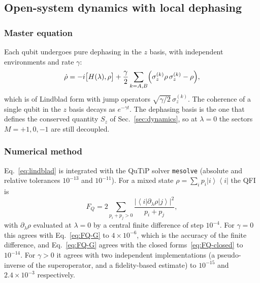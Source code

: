 \documentclass[11pt,a4paper]{article}
\newcommand{\ket}[1]{\left|#1\right\rangle}
\newcommand{\bra}[1]{\left\langle #1\right|}
\newcommand{\FQ}{F_Q}
\begin{document}
\subsection{Open-system dynamics with local dephasing}

\subsubsection{Master equation}
Each qubit undergoes pure dephasing in the $z$ basis, with independent environments and rate $\gamma$:
\begin{equation}
  \dot\rho=-i\bigl[H(\lambda),\rho\bigr]+\frac\gamma2\sum_{k=A,B}\Bigl(\sigma_z^{(k)}\rho\,\sigma_z^{(k)}-\rho\Bigr),
  \label{eq:lindblad}
\end{equation}
which is of Lindblad form \cite{Lindblad1976,GKS1976,BreuerPetruccione2002} with jump operators $\sqrt{\gamma/2}\,\sigma_z^{(k)}$. The coherence of a single qubit in the $z$ basis decays as $e^{-\gamma t}$. The dephasing basis is the one that defines the conserved quantity $S_z$ of Sec.~\ref{sec:dynamics}, so at $\lambda=0$ the sectors $M=+1,0,-1$ are still decoupled.

\subsubsection{Numerical method}
Eq.~\eqref{eq:lindblad} is integrated with the QuTiP solver \texttt{mesolve} (absolute and relative tolerances $10^{-13}$ and $10^{-11}$). For a mixed state $\rho=\sum_ip_i\ket i\!\bra i$ the QFI is
\begin{equation}
  \FQ=2\sum_{p_i+p_j>0}\frac{\lvert\bra i\partial_\lambda\rho\ket j\rvert^2}{p_i+p_j},
\end{equation}
with $\partial_\lambda\rho$ evaluated at $\lambda=0$ by a central finite difference of step $10^{-4}$. For $\gamma=0$ this agrees with Eq.~\eqref{eq:FQ-G} to $4\times10^{-6}$, which is the accuracy of the finite difference, and Eq.~\eqref{eq:FQ-G} agrees with the closed forms~\eqref{eq:FQ-closed} to $10^{-14}$. For $\gamma>0$ it agrees with two independent implementations (a pseudo-inverse of the superoperator, and a fidelity-based estimate) to $10^{-15}$ and $2.4\times10^{-3}$ respectively.
\end{document}
